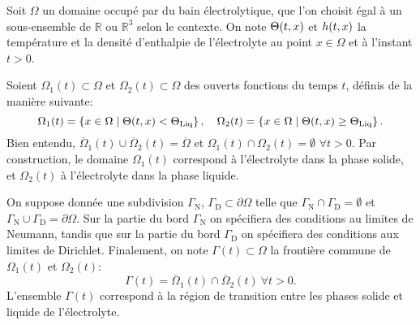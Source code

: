 Soit $\Omega$ un domaine occupé par du bain électrolytique, que l'on
choisit égal à un sous-ensemble de $\mathbb R$ ou $\mathbb R^3$ selon
le contexte. On note $\Theta(t, x)$ et $h(t, x)$
la température et la densité d'enthalpie de l'électrolyte au point $x
\in \Omega$ et à l'instant $t > 0$.

Soient $\Omega_1(t)\subset \Omega$ et $\Omega_2(t)\subset \Omega$
des ouverts fonctions du temps $t$, définis de la manière suivante:
\begin{equation}\label{eq:phase-domains}
  \Omega_1(t) = \cparent{x\in\Omega \mid %
                         \temperature(t, x) < \tliq},\quad %
  \Omega_2(t) = \cparent{x\in\Omega \mid \temperature(t, x) %
                         \geq \tliq}.
\end{equation}
Bien entendu, $\overline\Omega_1(t)\cup \overline\Omega_2(t) =
\overline\Omega$ et $\Omega_1(t) \cap \Omega_2(t) = \emptyset$
$\forall t > 0$. Par construction, le domaine $\Omega_1(t)$ correspond
à l'électrolyte dans la phase solide, et $\Omega_2(t)$ à l'électrolyte
dans la phase liquide.

On suppose donnée une subdivision $\Gamma_\mathrm{N}$,
$\Gamma_\mathrm{D}\subset \partial \Omega$ telle que
$\Gamma_\mathrm{N}\cap \Gamma_\mathrm{D} = \emptyset$ et
$\Gamma_\mathrm{N}\cup \Gamma_\mathrm{D} = \partial \Omega$. Sur la
partie du bord $\Gamma_\mathrm{N}$ on spécifiera des conditions au
limites de Neumann, tandis que sur la partie du bord
$\Gamma_\mathrm{D}$ on spécifiera des conditions aux limites de
Dirichlet. Finalement, on note $\Gamma(t)\subset \Omega$ la frontière
commune de $\Omega_1(t)$ et $\Omega_2(t)$:
\begin{equation}\label{eq:phase-frontier}
  \Gamma(t) = \overline \Omega_1(t)\cap\overline \Omega_2(t)\ \forall
  t > 0.
\end{equation}
L'ensemble $\Gamma(t)$ correspond à la région de transition entre les
phases solide et liquide de l'électrolyte.

